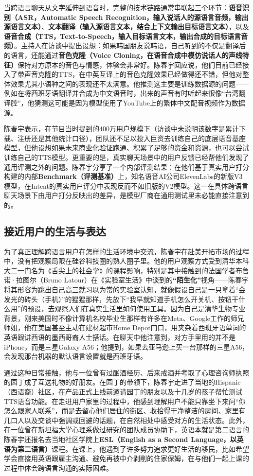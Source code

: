 \documentclass[UTF8,a4paper,11pt,fontset=fandol]{ctexart}
\begin{document}
当跨语言聊天从文字延伸到语音时，完整的技术链路通常串联起三个环节：\textbf{语音识别（ASR，Automatic Speech Recognition，输入说话人的源语言音频，输出源语言文本）}、\textbf{文本翻译（输入源语言文本，结合上下文输出目标语言文本）}，以及\textbf{语音合成（TTS，Text-to-Speech，输入目标语言文本，输出合成的目标语言音频）}。主持人在访谈中提出设想：如果韩国朋友说韩语，自己听到的不仅是翻译后的语言，还能通过\textbf{音色克隆（Voice Cloning，在语音合成中模仿说话人的声线特征）}保持对方原本的音色与情感，体验会非常好。陈春宇回应说，他们目前已经接入了带声音克隆的TTS，在中英互译上的音色克隆效果已经做得还不错，但他对整体效果尤其小语种之间的表现还不太满意。他推测这主要是训练数据源的问题——例如在将西班牙语翻译并合成为中文语音时，出来的声音有时听起来很像“台湾翻译腔”，他猜测这可能是因为模型使用了YouTube上的繁体中文配音视频作为数据源。

陈春宇表示，在节目当时提到的400万用户规模下（访谈中未说明该数字是累计下载、注册还是其他统计口径），团队还不足以投入巨资去训练自己的底层语音基座模型，但他设想如果未来商业化验证跑通、积累了足够的资金和资源，也可以尝试训练自己的TTS模型。更重要的是，真实聊天场景中的用户反馈已经帮他们发现了通用评测之外的问题。陈春宇分享了一个内部评测结果：在他们基于真实用户打分构建的内部\textbf{Benchmark（评测基准）}上，知名语音AI公司ElevenLabs的新版V3模型，在Intent的真实用户评分中表现反而不如旧版的V2模型。这一在具体跨语言聊天场景下由用户打分反映出的差异，是模型厂商在通用测试里未必能直接注意到的。

\subsection{接近用户的生活与表达}
为了真正理解跨语言用户在怎样的生活环境中交流，陈春宇在赴美开拓市场的过程中，没有把观察局限在硅谷科技圈的熟人圈子里。他的用户观察方式受到清华本科大二一门名为《舌尖上的社会学》的课程影响，特别是其中接触到的法国学者布鲁诺·拉图尔（Bruno Latour）在《实验室生活》中谈到的\textbf{“陌生化”}视角——陈春宇将其形容为跳出自己高三就习以为常的实验室认知，就像假设自己是一只拿着“会发光的砖头（手机）”的猩猩那样，先放下“我早就知道手机怎么开关机、按钮干什么用”的预设，去观察人们在真实生活里如何使用工具。因为自己是清华生物专业背景，刚来美国时不像计算机名校毕业生那样有许多在Meta、Google工作的师兄师姐，他在美国甚至主动在建材超市Home Depot门口，用夹杂着西班牙语单词的英语跟讲西语的墨西哥裔人士搭话。在聊天中他注意到，对方手里用的并不是iPhone，而是三星Galaxy A56；他提到，如果去亚马逊上买一台那样的三星A56，会发现那台机器的默认语言设置就是西班牙语。

通过这种日常接触，他与一位曾有过酗酒经历、后来戒酒并考取了心理咨询师执照的园丁成了互送礼物的好朋友。在园丁的带领下，陈春宇走进了当地的Hispanic（西语裔）社区，在产品正式上线前邀请园丁的朋友以及十几岁的孩子帮忙测试TTS语音功能。在走进用户家里的过程中，他感到理解用户不能只靠坐下来问“你怎么跟家人联系”，而是去留心他们居住的街区、收拾得干净整洁的房间、家里有几口人以及交谈中强调或回避的话题，在自然相处中感受对方的生活状态。此外，在一位曾在斯坦福大学心理系做过研究的团队成员协助下，英语本就是第二语言的陈春宇还报名去当地社区学院上\textbf{ESL（English as a Second Language，以英语为第二语言）}课程。在课上，他遇到了许多努力追求更好生活的移民，比如希望学会直接用英语跟雇主沟通、避免再被中介剥削的住家保姆，在与他们一起上课的过程中体会跨语言沟通的实际困难。
\end{document}
